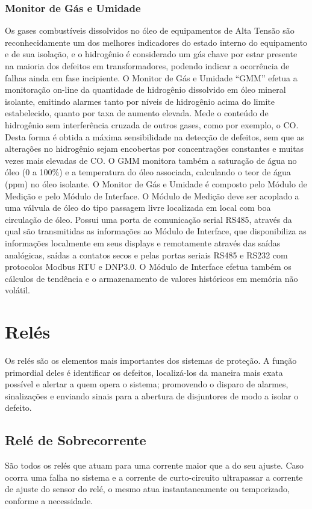 \documentclass[a5paper,english,spanish,brazil]{ufsc-thesis}
\begin{document}
\subsubsection{Monitor de Gás e Umidade}
Os gases combustíveis dissolvidos no óleo de equipamentos de Alta Tensão são reconhecidamente um dos melhores indicadores do estado interno do equipamento e de sua isolação, e o hidrogênio é considerado um gás chave por estar presente na maioria dos defeitos em transformadores, podendo indicar a ocorrência de falhas ainda em fase incipiente. O Monitor de Gás e Umidade “GMM” efetua a monitoração on-line da quantidade de hidrogênio dissolvido em óleo mineral isolante, emitindo alarmes tanto por níveis de hidrogênio acima do limite estabelecido, quanto por taxa de aumento elevada. Mede o conteúdo de hidrogênio sem interferência cruzada de outros gases, como por exemplo, o CO. Desta forma é obtida a máxima sensibilidade na detecção de defeitos, sem que as alterações no hidrogênio sejam encobertas por concentrações constantes e muitas vezes mais elevadas de CO. O GMM monitora também a saturação de água no óleo (0 a 100\%) e a temperatura do óleo associada, calculando o teor de água (ppm) no óleo isolante. O Monitor de Gás e Umidade é composto pelo Módulo de Medição e pelo Módulo de Interface. O Módulo de Medição deve ser acoplado a uma válvula de óleo do tipo passagem livre localizada em local com boa circulação de óleo. Possui uma porta de comunicação serial RS485, através da qual são transmitidas as informações ao Módulo de Interface, que disponibiliza as informações localmente em seus displays e remotamente através das saídas analógicas, saídas a contatos secos e pelas portas seriais RS485 e RS232 com protocolos Modbus RTU e DNP3.0. O Módulo de Interface efetua também os cálculos de tendência e o armazenamento de valores históricos em memória não volátil.

\section{Relés}
Os relés são os elementos mais importantes dos sistemas de proteção. A função primordial deles é identificar os defeitos, localizá-los da maneira mais exata possível e alertar a quem opera o sistema; promovendo o disparo de alarmes, sinalizações e enviando sinais para a abertura de disjuntores de modo a isolar o defeito.\par

\subsection{Relé de Sobrecorrente}
São todos os relés que atuam para uma corrente maior que a do seu ajuste. Caso ocorra uma falha no sistema e a corrente de curto-circuito ultrapassar a corrente de ajuste do sensor do relé, o mesmo atua instantaneamente ou temporizado, conforme a necessidade.\par
\end{document}
